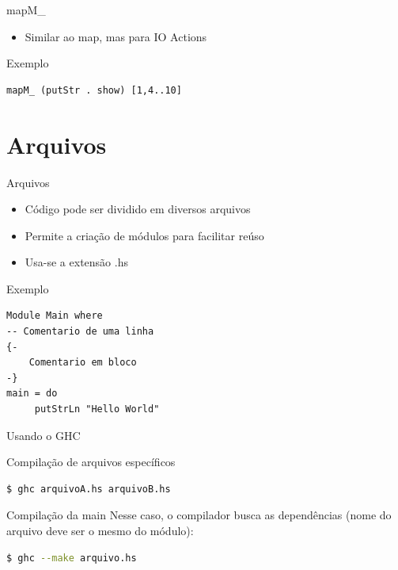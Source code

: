 \documentclass{beamer}
\begin{document}
		\begin{frame}[fragile]{mapM\_}
		\begin{itemize}
		 \item Similar ao map, mas para IO Actions
		\end{itemize}

		 \begin{block}{Exemplo}
		  \begin{lstlisting}
mapM_ (putStr . show) [1,4..10]
		  \end{lstlisting}
		 \end{block}

		\end{frame}


	\section{Arquivos}
	
	\begin{frame}{}
	\end{frame}
	
		\begin{frame}[fragile]{Arquivos}
		 \begin{itemize}
		  \item Código pode ser dividido em diversos arquivos
		  \item Permite a criação de módulos para facilitar reúso
		  \item Usa-se a extensão .hs
		 \end{itemize}
		 
		 \begin{block}{Exemplo}
		  \begin{lstlisting}
Module Main where
-- Comentario de uma linha
{-
	Comentario em bloco
-}
main = do
     putStrLn "Hello World"
		  \end{lstlisting}
		 \end{block}
		\end{frame}
		
		
		\begin{frame}[fragile]{Usando o GHC}
		 
		 \begin{block}{Compilação de arquivos específicos}		  
		 \begin{lstlisting}[language=Bash]
$ ghc arquivoA.hs arquivoB.hs
		 \end{lstlisting}
		 \end{block}
		 
		 \begin{block}{Compilação da main}
		  Nesse caso, o compilador busca as dependências (nome do arquivo deve ser o mesmo do módulo):
		  \begin{lstlisting}[language=Bash]
$ ghc --make arquivo.hs
			\end{lstlisting}
		 \end{block}
		 
		\end{frame}
		 
\end{document}
